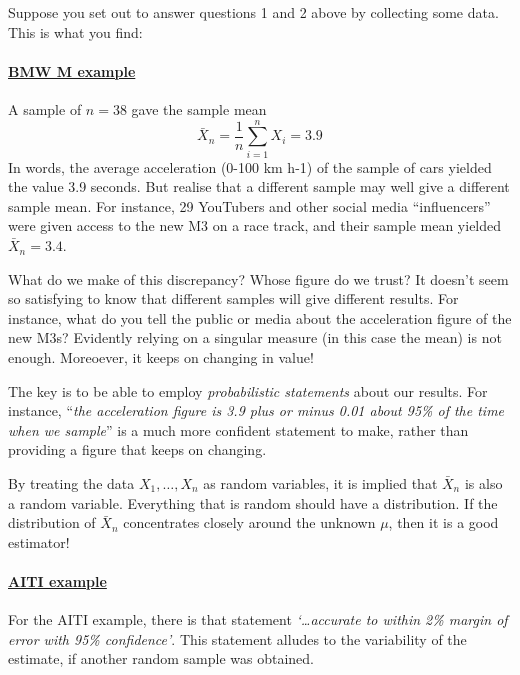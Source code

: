 \documentclass[
]{book}
\theoremstyle{definition}
\theoremstyle{definition}
\theoremstyle{definition}
\theoremstyle{definition}
\theoremstyle{remark}
\begin{document}
Suppose you set out to answer questions 1 and 2 above by collecting some data.
This is what you find:

\hypertarget{bmw-m-example}{%
\paragraph*{\texorpdfstring{\uline{BMW M example}}{BMW M example}}\label{bmw-m-example}}

A sample of \(n=38\) gave the sample mean
\[\bar X_n = \frac{1}{n}\sum_{i=1}^n X_i = 3.9\]
In words, the average acceleration (0-100 km h-1) of the sample of cars yielded the value 3.9 seconds. But realise that a different sample may well give a different sample mean. For instance, 29 YouTubers and other social media ``influencers'' were given access to the new M3 on a race track, and their sample mean yielded \(\bar X_n = 3.4\).

What do we make of this discrepancy? Whose figure do we trust? It doesn't seem so satisfying to know that different samples will give different results. For instance, what do you tell the public or media about the acceleration figure of the new M3s? Evidently relying on a singular measure (in this case the mean) is not enough. Moreoever, it keeps on changing in value!

The key is to be able to employ \emph{probabilistic statements} about our results. For instance, ``\emph{the acceleration figure is 3.9 plus or minus 0.01 about 95\% of the time when we sample}'' is a much more confident statement to make, rather than providing a figure that keeps on changing.

By treating the data \(X_1,\dots,X_n\) as random variables, it is implied that \(\bar X_n\) is also a random variable. Everything that is random should have a distribution. If the distribution of
\(\bar X_n\) concentrates closely around the unknown \(\mu\), then it is a good estimator!

\hypertarget{aiti-example}{%
\paragraph*{\texorpdfstring{\uline{AITI example}}{AITI example}}\label{aiti-example}}

For the AITI example, there is that statement \emph{`\ldots accurate to within 2\% margin of error with 95\% confidence'}. This statement alludes to the variability of the estimate, if another random sample was obtained.
\end{document}
